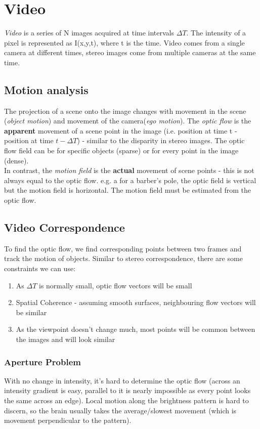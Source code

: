 \section{Video}
\emph{Video} is a series of N images acquired at time intervals $\Delta{T}$. The intensity of a pixel is represented as I(x,y,t), where t is the time. Video comes from a single camera at different times, stereo images come from multiple cameras at the same time. 

\subsection{Motion analysis}
The projection of a scene onto the image changes with movement in the scene (\emph{object motion}) and movement of the camera(\emph{ego motion}). The \emph{optic flow} is the \textbf{apparent} movement of a scene point in the image (i.e. position at time t - position at time $t-\Delta T$) - similar to the disparity in stereo images. The optic flow field can be for specific objects (sparse) or for every point in the image (dense). \\

In contrast, the \emph{motion field} is the \textbf{actual} movement of scene points - this is not always equal to the optic flow. e.g. a for a barber's pole, the optic field is vertical but the motion field is horizontal. The motion field must be estimated from the optic flow.

\subsection{Video Correspondence}
To find the optic flow, we find corresponding points between two frames and track the motion of objects. Similar to stereo correspondence, there are some constraints we can use:
\begin{enumerate}
    \item As $\Delta T$ is normally small, optic flow vectors will be small
    \item Spatial Coherence - assuming smooth surfaces, neighbouring flow vectors will be similar
    \item As the viewpoint doesn't change much, most points will be common between the images and will look similar 
\end{enumerate}

\subsubsection{Aperture Problem}
With no change in intensity, it's hard to determine the optic flow (across an intensity gradient is easy, parallel to it is nearly impossible as every point looks the same across an edge). Local motion along the brightness pattern is hard to discern, so the brain usually takes the average/slowest movement (which is movement perpendicular to the pattern). \\

